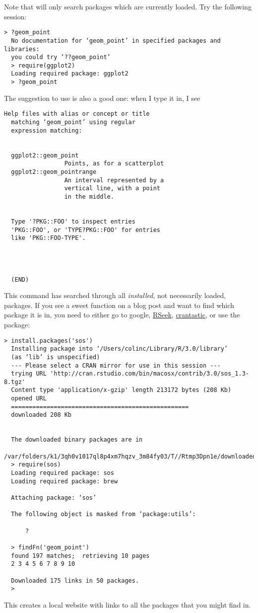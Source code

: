 \documentclass[12pt]{article}
\newcommand{\code}[1]{\Colorbox{code}{\texttt{\footnotesize #1}}}
\begin{document}
\begin{description}
  Note that \code{?} will only search packages which are currently loaded.  
  Try the following session:

  \begin{lstlisting}[style=bash]
  > ?geom_point
  No documentation for ‘geom_point’ in specified packages and libraries:
  you could try ‘??geom_point’
  > require(ggplot2)
  Loading required package: ggplot2
  > ?geom_point 
  \end{lstlisting}

  The suggestion to use \code{??} is also a good one: when I type it in, I see

  \begin{lstlisting}[style=bash]
  Help files with alias or concept or title
  matching ‘geom_point’ using regular
  expression matching:


  ggplot2::geom_point
                 Points, as for a scatterplot
  ggplot2::geom_pointrange
                 An interval represented by a
                 vertical line, with a point
                 in the middle.


  Type '?PKG::FOO' to inspect entries
  'PKG::FOO', or 'TYPE?PKG::FOO' for entries
  like 'PKG::FOO-TYPE'.




  (END) 
  \end{lstlisting}
  This command has searched through all \emph{installed}, not necessarily loaded,
  packages.  If you see a sweet function on a blog post and want to find which 
  package it is in, you need to either go to google,
  \href{http://www.rseek.org/}{RSeek},
  \href{http://crantastic.org/}{crantastic},
  or use the \code{sos} package:

  \begin{lstlisting}[style=bash]
  > install.packages('sos')
  Installing package into ‘/Users/colinc/Library/R/3.0/library’
  (as ‘lib’ is unspecified)
  --- Please select a CRAN mirror for use in this session ---
  trying URL 'http://cran.rstudio.com/bin/macosx/contrib/3.0/sos_1.3-8.tgz'
  Content type 'application/x-gzip' length 213172 bytes (208 Kb)
  opened URL
  ==================================================
  downloaded 208 Kb


  The downloaded binary packages are in
    /var/folders/k1/3qh0v1017ql8p4xm7hqzv_3m84fy03/T//Rtmp3Dpn1e/downloaded_packages
  > require(sos)
  Loading required package: sos
  Loading required package: brew

  Attaching package: ‘sos’

  The following object is masked from ‘package:utils’:

      ?

  > findFn('geom_point')
  found 197 matches;  retrieving 10 pages
  2 3 4 5 6 7 8 9 10 

  Downloaded 175 links in 50 packages.
  >
  \end{lstlisting}

This creates a local website with links to all the packages that you might find
\code{geom\_point} in.  

\end{description}
\end{document}
